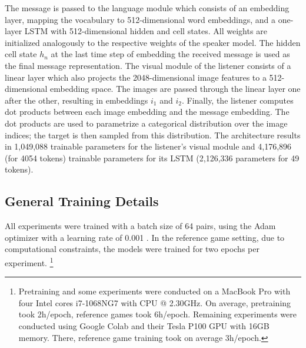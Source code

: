 The message is passed to the language module which consists of an embedding layer, mapping the vocabulary to 512-dimensional word embeddings, and a one-layer LSTM with 512-dimensional hidden and cell states. All weights are initialized analogously to the respective weights of the speaker model. The hidden cell state $h_n$ at the last time step of embedding the received message is used as the final message representation. 
The visual module of the listener consists of a linear layer which also projects the 2048-dimensional image features to a 512-dimensional embedding space. The images are passed through the linear layer one after the other, resulting in embeddings $i_1$ and $i_2$. Finally, the listener computes dot products between each image embedding and the message embedding. The dot products are used to parametrize a categorical distribution over the image indices; the target is then sampled from this distribution.  
The architecture results in 1,049,088 trainable parameters for the listener's visual module and 4,176,896 (for 4054 tokens) trainable parameters for its LSTM (2,126,336 parameters for 49 tokens).


\subsection{General Training Details}
\label{general_train_details}
All experiments were trained with a batch size of 64 pairs, using the Adam optimizer with a learning rate  of 0.001 \parencite{kingma2014adam}. In the reference game setting, due to computational constraints, the models were trained for two epochs per experiment. \footnote{Pretraining and some experiments were conducted on a MacBook Pro with four Intel cores i7-1068NG7 with CPU @ 2.30GHz. On average, pretraining took 2h/epoch, reference games took 6h/epoch. Remaining experiments were conducted using Google Colab and their Tesla P100 GPU with 16GB memory. There, reference game training took on average 3h/epoch.} 

